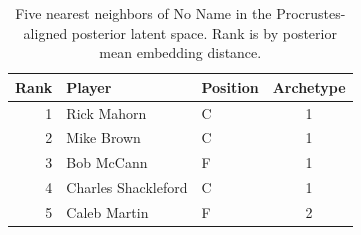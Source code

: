 \begin{table}[htbp]
  \centering\small
  \begin{tabular}{rllc}
    \toprule
    Rank & Player & Position & Archetype \\
    \midrule
    1 & Rick Mahorn & C & 1 \\
    2 & Mike Brown & C & 1 \\
    3 & Bob McCann & F & 1 \\
    4 & Charles Shackleford & C & 1 \\
    5 & Caleb Martin & F & 2 \\
    \bottomrule
  \end{tabular}
  \caption{Five nearest neighbors of No Name in the Procrustes-aligned posterior latent space. Rank is by posterior mean embedding distance.}
  \label{tab:No_Name_neighbors}
\end{table}

